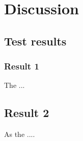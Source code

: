 \chapter{Discussion}
\section{Test results}

\subsection{Result 1}\label{platformDesAndBuo}
The ...
\section{Result 2}
As the ....
